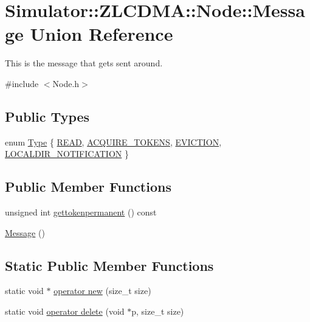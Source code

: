 \hypertarget{union_simulator_1_1_z_l_c_d_m_a_1_1_node_1_1_message}{\section{Simulator\+:\+:Z\+L\+C\+D\+M\+A\+:\+:Node\+:\+:Message Union Reference}
\label{union_simulator_1_1_z_l_c_d_m_a_1_1_node_1_1_message}
}


This is the message that gets sent around.  




{\ttfamily \#include $<$Node.\+h$>$}

\subsection*{Public Types}
\begin{DoxyCompactItemize}
\item 
enum \hyperlink{union_simulator_1_1_z_l_c_d_m_a_1_1_node_1_1_message_af07062ac08bff2800b7ca0ad29c28d0c}{Type} \{ \hyperlink{union_simulator_1_1_z_l_c_d_m_a_1_1_node_1_1_message_af07062ac08bff2800b7ca0ad29c28d0ca642e5d0687d69535de9fd88412e15f03}{R\+E\+A\+D}, 
\hyperlink{union_simulator_1_1_z_l_c_d_m_a_1_1_node_1_1_message_af07062ac08bff2800b7ca0ad29c28d0ca25e4d9fbd969c01844ecc6e90bcac5d6}{A\+C\+Q\+U\+I\+R\+E\+\_\+\+T\+O\+K\+E\+N\+S}, 
\hyperlink{union_simulator_1_1_z_l_c_d_m_a_1_1_node_1_1_message_af07062ac08bff2800b7ca0ad29c28d0cabeb62e4be3f27bef014f88b3283d3c4a}{E\+V\+I\+C\+T\+I\+O\+N}, 
\hyperlink{union_simulator_1_1_z_l_c_d_m_a_1_1_node_1_1_message_af07062ac08bff2800b7ca0ad29c28d0ca53a8b1e50c118e7caa1cffc02b34075e}{L\+O\+C\+A\+L\+D\+I\+R\+\_\+\+N\+O\+T\+I\+F\+I\+C\+A\+T\+I\+O\+N}
 \}
\end{DoxyCompactItemize}
\subsection*{Public Member Functions}
\begin{DoxyCompactItemize}
\item 
unsigned int \hyperlink{union_simulator_1_1_z_l_c_d_m_a_1_1_node_1_1_message_a3b3351c621b0a99a26aa9c70ec802c3f}{gettokenpermanent} () const 
\item 
\hyperlink{union_simulator_1_1_z_l_c_d_m_a_1_1_node_1_1_message_adba9119348fbc4dcde4fa2f0f8930d85}{Message} ()
\end{DoxyCompactItemize}
\subsection*{Static Public Member Functions}
\begin{DoxyCompactItemize}
\item 
static void $\ast$ \hyperlink{union_simulator_1_1_z_l_c_d_m_a_1_1_node_1_1_message_acc3bb660b01a9d4d9d3b812e427269a8}{operator new} (size\+\_\+t size)
\item 
static void \hyperlink{union_simulator_1_1_z_l_c_d_m_a_1_1_node_1_1_message_a13dd7735b07abad5652ef20073b63c54}{operator delete} (void $\ast$p, size\+\_\+t size)
\end{DoxyCompactItemize}
